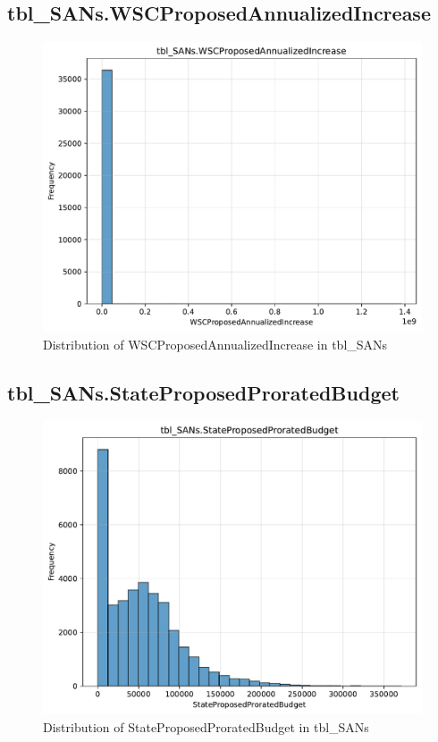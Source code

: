 \subsection{tbl\_SANs.WSCProposedAnnualizedIncrease}

\begin{figure}[htbp]
\centering
\includegraphics[width=\textwidth]{figures/dbo_tbl_SANs_WSCProposedAnnualizedIncrease.pdf}
\caption{Distribution of WSCProposedAnnualizedIncrease in tbl\_SANs}
\end{figure}\newpage

\subsection{tbl\_SANs.StateProposedProratedBudget}

\begin{figure}[htbp]
\centering
\includegraphics[width=\textwidth]{figures/dbo_tbl_SANs_StateProposedProratedBudget.pdf}
\caption{Distribution of StateProposedProratedBudget in tbl\_SANs}
\end{figure}\newpage

